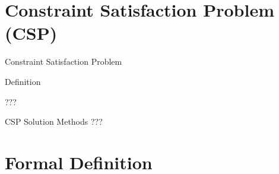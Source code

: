 \documentclass{beamer}
\begin{document}
\section{Constraint Satisfaction Problem (CSP)}

\begin{frame}{Constraint Satisfaction Problem}
  \begin{block}{Definition}

  \end{block}
  \begin{examples}
    ???
  \end{examples}
\end{frame}

\begin{frame}{CSP Solution Methods}
  ???
\end{frame}

\section{Formal Definition}
\end{document}
